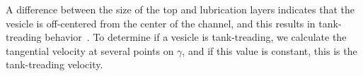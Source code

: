\documentclass[twoside,twocolumn,9pt]{article}
\newcommand{\subfigimg}[3][,]{%
  \setbox1=\hbox{\texttt{[image: \#3]}}%
  \leavevmode\rlap{\usebox1}%
  \rlap{\hspace*{0pt}\raisebox{\dimexpr\ht1-0\baselineskip}{\bf
  \normalsize #2}}%
  \phantom{\usebox1}%
}
\begin{document}

A difference between the size of the top and lubrication layers
indicates that the vesicle is off-centered from the center of the
channel, and this results in tank-treading behavior~\cite{aga-bir2020}.
To determine if a vesicle is tank-treading, we calculate the tangential
velocity at several points on $\gamma$, and if this value is constant,
this is the tank-treading velocity.

\end{document}
